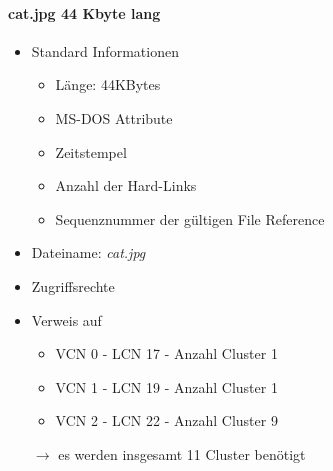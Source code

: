 \documentclass[a4paper]{article}
\begin{document}
\paragraph{cat.jpg 44 Kbyte lang}
\begin{itemize}
    \item Standard Informationen
        \begin{itemize}
            \item Länge: 44KBytes
            \item MS-DOS Attribute
            \item Zeitstempel
            \item Anzahl der Hard-Links
            \item Sequenznummer der gültigen File Reference
        \end{itemize}
    \item Dateiname: \textit{cat.jpg}
    \item Zugriffsrechte
    \item Verweis auf \\
        \begin{itemize}
            \item VCN 0 - LCN 17 - Anzahl Cluster 1
            \item VCN 1 - LCN 19 - Anzahl Cluster 1
            \item VCN 2 - LCN 22 - Anzahl Cluster 9
        \end{itemize}
        $\rightarrow$ es werden insgesamt 11 Cluster benötigt
    \end{itemize}
\end{document}
